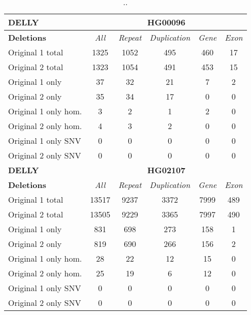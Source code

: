 \begin{table}[htb]
\begin{center}
\begin{tabular}{|l|c||c|c|c|c|}
\hline
{\bf DELLY} & \multicolumn{5}{|c|}{\bf HG00096} \\
\hline
\cline{2-6}
{\bf Deletions} & {\it All} & {\it Repeat} & {\it Duplication} & {\it Gene} & {\it Exon} \\
\hline
Original 1 total & 1325 & 1052 & 495 & 460 & 17\\ 
\hline
Original 2 total & 1323 & 1054 & 491 & 453 & 15\\ 
\hline
Original 1 only & 37 & 32 & 21 & 7 & 2\\ 
\hline
Original 2 only & 35 & 34 & 17 & 0 & 0\\ 
\hline
Original 1 only hom. & 3 & 2 & 1 & 2 & 0\\ 
\hline
Original 2 only hom. & 4 & 3 & 2 & 0 & 0\\ 
\hline
Original 1 only SNV & 0 & 0 & 0 & 0 & 0\\ 
\hline
Original 2 only SNV & 0 & 0 & 0 & 0 & 0\\ 
\hline
\hline
{\bf DELLY} & \multicolumn{5}{|c|}{\bf HG02107} \\
\hline
\cline{2-6}
{\bf Deletions} & {\it All} & {\it Repeat} & {\it Duplication} & {\it Gene} & {\it Exon} \\
\hline
Original 1 total & 13517 & 9237 & 3372 & 7999 & 489\\ 
\hline
Original 2 total & 13505 & 9229 & 3365 & 7997 & 490\\ 
\hline
Original 1 only & 831 & 698 & 273 & 158 & 1\\ 
\hline
Original 2 only & 819 & 690 & 266 & 156 & 2\\ 
\hline
Original 1 only hom. & 28 & 22 & 12 & 15 & 0\\ 
\hline
Original 2 only hom. & 25 & 19 & 6 & 12 & 0\\ 
\hline
Original 1 only SNV & 0 & 0 & 0 & 0 & 0\\ 
\hline
Original 2 only SNV & 0 & 0 & 0 & 0 & 0\\ 
\hline
\end{tabular}
\end{center}
\caption{ .. }
\label{tab:orig-vs-shuf-delly-deletions}
\end{table}


